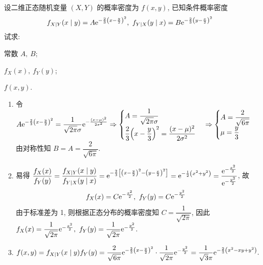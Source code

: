 \begin{example}
    设二维正态随机变量 $(X,Y)$ 的概率密度为 $f(x,y)$, 已知条件概率密度 $$f_{X\mid Y}(x\mid y)=A\mathrm{e}^{-\frac{2}{3}\qty(x-\frac{y}{2})^2},~f_{Y\mid X}(y\mid x)=B\mathrm{e}^{-\frac{2}{3}\qty(y-\frac{x}{2})^2}$$
    试求: \begin{enumerate*}[label=(\arabic{*})]
        \item 常数 $A,~B$;
        \item $f_X(x),~f_Y(y)$;
        \item $f(x,y)$.
    \end{enumerate*}
\end{example}
\begin{solution}
    \begin{enumerate}[label=(\arabic{*})]
        \item 令 $\displaystyle A\mathrm{e}^{-\frac{2}{3}\qty(x-\frac{y}{2})^2}=\dfrac{1}{\sqrt{2\pi}\sigma}\mathrm{e}^{-\frac{(x-\mu)^2}{2\sigma^2}}\Rightarrow \begin{cases}
            A=\dfrac{1}{\sqrt{2\pi}\sigma}\\[6pt]
            \dfrac{2}{3}\qty(x-\dfrac{y}{3})^2=\dfrac{(x-\mu)^2}{2\sigma^2}
        \end{cases}\Rightarrow\begin{cases}
            A=\dfrac{2}{\sqrt{6\pi}}\\[6pt]
            \mu=\dfrac{y}{3}
        \end{cases}$ 由对称性知 $B=A=\dfrac{2}{\sqrt{6\pi}}.$
        \item 易得 $\dfrac{f_X(x)}{f_Y(y)}=\dfrac{f_{X\mid Y}(x\mid y)}{f_{Y\mid X}(y\mid x)}=\mathrm{e}^{-\frac{2}{3}\qty[\qty(x-\frac{y}{2})^2-\qty(y-\frac{x}{2})^2]}=\mathrm{e}^{-\frac{1}{2}\qty(x^2+y^2)}=\dfrac{\mathrm{e}^{-\frac{x^2}{2}}}{\mathrm{e}^{-\frac{y^2}{2}}}$, 故 $$f_X(x)=C\mathrm{e}^{-\frac{x^2}{2}},~f_Y(y)=C\mathrm{e}^{-\frac{y^2}{2}}$$
        由于标准差为 1, 则根据正态分布的概率密度知 $C=\dfrac{1}{\sqrt{2\pi}}$, 因此 $f_X(x)=\dfrac{1}{\sqrt{2\pi}}\mathrm{e}^{-\frac{x^2}{2}},~f_Y(y)=\dfrac{1}{\sqrt{2\pi}}\mathrm{e}^{-\frac{y^2}{2}}.$
        \item $f(x,y)=f_{X\mid Y}(x\mid y)f_Y(y)=\dfrac{2}{\sqrt{6\pi}}\mathrm{e}^{-\frac{2}{3}\qty(x-\frac{y}{2})^2}\cdot \dfrac{1}{\sqrt{2\pi}}\mathrm{e}^{-\frac{y^2}{2}}=\dfrac{1}{\sqrt{3}\pi}\mathrm{e}^{-\frac{2}{3}\qty(x^2-xy+y^2)}.$
    \end{enumerate}
\end{solution}

